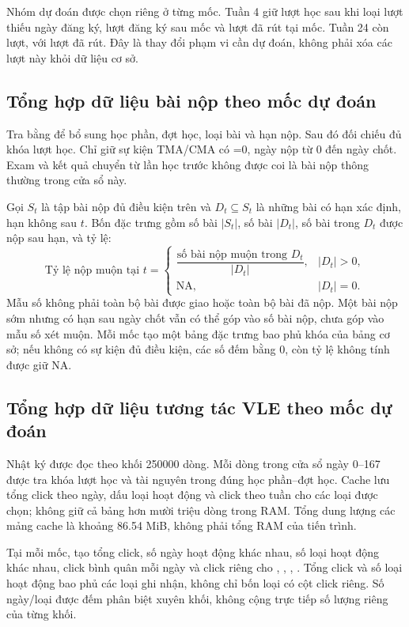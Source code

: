Nhóm dự đoán được chọn riêng ở từng mốc. Tuần 4 giữ \NWeekFour{} lượt học sau khi loại \NUnknownRegistration{} lượt thiếu ngày đăng ký, \NLateRegistrationWeekFour{} lượt đăng ký sau mốc và \NWithdrawnByWeekFour{} lượt đã rút tại mốc. Tuần 24 còn \NWeekTwentyFour{} lượt, với \NWithdrawnByWeekTwentyFour{} lượt đã rút. Đây là thay đổi phạm vi cần dự đoán, không phải xóa các lượt này khỏi dữ liệu cơ sở.

\subsection{Tổng hợp dữ liệu bài nộp theo mốc dự đoán}
Tra  bằng  để bổ sung học phần, đợt học, loại bài và hạn nộp. Sau đó đối chiếu đủ khóa lượt học. Chỉ giữ sự kiện TMA/CMA có =0, ngày nộp từ 0 đến ngày chốt. Exam và kết quả chuyển từ lần học trước không được coi là bài nộp thông thường trong cửa sổ này.

Gọi \(S_t\) là tập bài nộp đủ điều kiện trên và \(D_t\subseteq S_t\) là những bài có hạn xác định, hạn không sau \(t\). Bốn đặc trưng gồm số bài \(|S_t|\), số bài \(|D_t|\), số bài trong \(D_t\) được nộp sau hạn, và tỷ lệ:
\[
\text{Tỷ lệ nộp muộn tại }t=
\begin{cases}
\dfrac{\text{số bài nộp muộn trong }D_t}{|D_t|},& |D_t|>0,\\[6pt]
\text{NA},& |D_t|=0.
\end{cases}
\]
Mẫu số không phải toàn bộ bài được giao hoặc toàn bộ bài đã nộp. Một bài nộp sớm nhưng có hạn sau ngày chốt vẫn có thể góp vào số bài nộp, chưa góp vào mẫu số xét muộn. Mỗi mốc tạo một bảng đặc trưng bao phủ khóa của bảng cơ sở; nếu không có sự kiện đủ điều kiện, các số đếm bằng 0, còn tỷ lệ không tính được giữ NA.

\subsection{Tổng hợp dữ liệu tương tác VLE theo mốc dự đoán}
Nhật ký được đọc theo khối \num{250000} dòng. Mỗi dòng trong cửa sổ ngày 0--167 được tra khóa lượt học và tài nguyên trong đúng học phần--đợt học. Cache lưu tổng click theo ngày, dấu loại hoạt động và click theo tuần cho các loại được chọn; không giữ cả bảng hơn mười triệu dòng trong RAM. Tổng dung lượng các mảng cache là khoảng \num{86.54} MiB, không phải tổng RAM của tiến trình.

Tại mỗi mốc, tạo tổng click, số ngày hoạt động khác nhau, số loại hoạt động khác nhau, click bình quân mỗi ngày và click riêng cho , , , . Tổng click và số loại hoạt động bao phủ các loại ghi nhận, không chỉ bốn loại có cột click riêng. Số ngày/loại được đếm phân biệt xuyên khối, không cộng trực tiếp số lượng riêng của từng khối.

